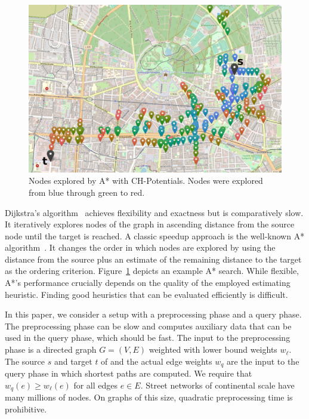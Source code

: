\documentclass[letterpaper]{article} %
\begin{document}
\begin{figure}

\centering
\includegraphics[width=\columnwidth]{fig/searchspace_st.png}


\caption{Nodes explored by A* with CH-Potentials. Nodes were explored from blue through green to red.}
\label{img:search-space}
\end{figure}


Dijkstra's algorithm~\cite{d-ntpcg-59} achieves flexibility and exactness but is comparatively slow.
It iteratively explores nodes of the graph in ascending distance from the source node until the target is reached.
A classic speedup approach is the well-known A* algorithm~\cite{hnr-afbhd-68}.
It changes the order in which nodes are explored by using the distance from the source plus an estimate of the remaining distance to the target as the ordering criterion.
Figure~\ref{img:search-space} depicts an example A* search.
While flexible, A*'s performance crucially depends on the quality of the employed estimating heuristic.
Finding good heuristics that can be evaluated efficiently is difficult.

In this paper, we consider a setup with a preprocessing phase and a query phase.
The preprocessing phase can be slow and computes auxiliary data that can be used in the query phase, which should be fast.
The input to the preprocessing phase is a directed graph $G=(V,E)$ weighted with lower bound weights $w_\ell$.
The source $s$ and target $t$ of and the actual edge weights $w_q$ are the input to the query phase in which shortest paths are computed.
We require that $w_q(e)\ge w_\ell(e)$ for all edges $e \in E$.
%
Street networks of continental scale have many millions of nodes.
On graphs of this size, quadratic preprocessing time is prohibitive.
\end{document}
